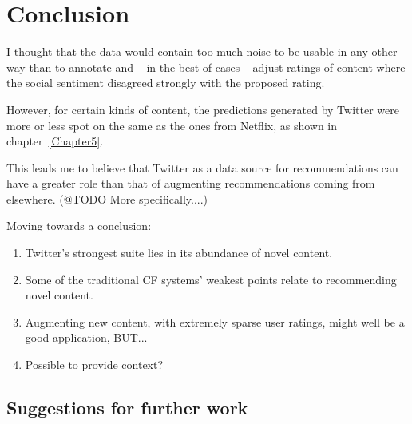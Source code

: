
\chapter{Conclusion} %

\label{Chapter6}




I thought that the data would contain too much noise to be usable in any other way than to annotate and -- in the best of cases -- adjust ratings of content where the social sentiment disagreed strongly with the proposed rating.

However, for certain kinds of content, the predictions generated by Twitter were more or less spot on the same as the ones from Netflix, as shown in chapter~\ref{Chapter5}.

This leads me to believe that Twitter as a data source for recommendations can have a greater role than that of augmenting recommendations coming from elsewhere. (@TODO More specifically....)

Moving towards a conclusion:

\begin{enumerate}
  \item Twitter's strongest suite lies in its abundance of novel content.
  \item Some of the traditional CF systems' weakest points relate to recommending novel content.
  \item Augmenting new content, with extremely sparse user ratings, might well be a good application, BUT...
  \item Possible to provide context?
\end{enumerate}

\section{Suggestions for further work} %
\label{sec:suggestions_for_further_work}

